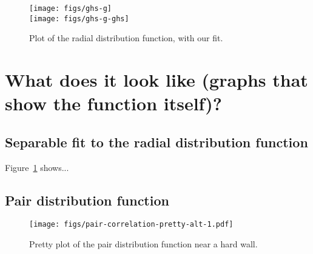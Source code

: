 \documentclass[letterpaper,twocolumn,amsmath,amssymb,pre]{revtex4-1}
\begin{document}
\begin{figure}
  \centering
  \texttt{[image: figs/ghs-g]}\\
  \texttt{[image: figs/ghs-g-ghs]}
  \caption{Plot of the radial distribution function, with our fit.}\label{fig:radial-distribution}
\end{figure}
\section{What does it look like (graphs that show the function itself)?}
\subsection{Separable fit to the radial distribution function}
Figure~\ref{fig:radial-distribution} shows...

\subsection{Pair distribution function}

\begin{figure}
  \texttt{[image: figs/pair-correlation-pretty-alt-1.pdf]}
  \caption{Pretty plot of the pair distribution function near a hard
    wall.}\label{fig:pair-distribution-1}
\end{figure}
\end{document}
